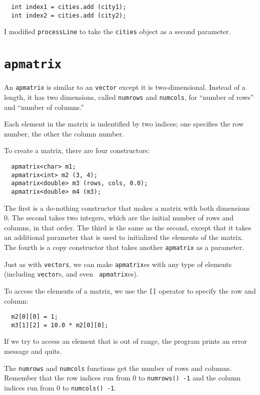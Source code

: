 \begin{verbatim}
  int index1 = cities.add (city1);
  int index2 = cities.add (city2);
\end{verbatim}
%
I modified {\tt processLine} to take the {\tt cities} object
as a second parameter.

\section {{\tt apmatrix}}

An {\tt apmatrix} is similar to an {\tt vector} except it
is two-dimensional.  Instead of a length, it has two
dimensions, called {\tt numrows} and {\tt numcols}, for
``number of rows'' and ``number of columns.''

Each element in the matrix is indentified by two indices;
one specifies the row number, the other the column number.


To create a matrix, there are four constructors:

\begin{verbatim}
  apmatrix<char> m1;
  apmatrix<int> m2 (3, 4);
  apmatrix<double> m3 (rows, cols, 0.0);
  apmatrix<double> m4 (m3);
\end{verbatim}
%
The first is a do-nothing constructor that makes a matrix with both
dimensions 0.  The second takes two integers, which are the initial
number of rows and columns, in that order.  The third is the same as
the second, except that it takes an additional parameter that is used
to initialized the elements of the matrix.  The fourth is a copy
constructor that takes another {\tt apmatrix} as a parameter.


Just as with {\tt vectors}, we can make {\tt apmatrix}es with any
type of elements (including {\tt vector}s, and even {\tt
apmatrix}es).

To access the elements of a matrix, we use the {\tt []} operator
to specify the row and column:

\begin{verbatim}
  m2[0][0] = 1;
  m3[1][2] = 10.0 * m2[0][0];
\end{verbatim}
%
If we try to access an element that is out of range, the program
prints an error message and quits.


The {\tt numrows} and {\tt numcols} functions get the number of
rows and columns.  Remember that the row indices run from 0 to
{\tt numrows() -1} and the column indices run from 0 to
{\tt numcols() -1}.


